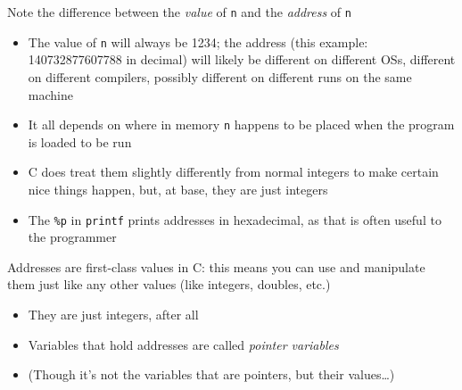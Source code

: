 \documentclass{beamer}
\def\code#1{{\ifmmode\else\large\fi\tt#1}}
\begin{document}
\begin{frame}
Note the difference between the {\em value\/} of \code{n} and the {\em
  address\/} of \code{n}
\begin{itemize}
\item{The value of \code{n} will always be 1234; the address
  (this example: 140732877607788 in decimal) will likely
  be different on different OSs, different on different compilers, possibly
  different on different runs on the same machine}

\item{It all depends on where in memory \code{n} happens to be placed
when the program is loaded to be run}
\end{itemize}
\end{frame}

\begin{frame}
%
\begin{itemize}
\item{C does treat them slightly differently from normal integers to make
  certain nice things happen, but, at base, they are just integers}

\item{The \code{\%p} in \code{printf} prints addresses in hexadecimal,
  as that is often useful to the programmer}

\end{itemize}
\end{frame}

\begin{frame}
Addresses are first-class values in C: this means you can use and manipulate
them just like any other values (like integers, doubles, etc.)
\begin{itemize}
\item{They are just integers, after all}

\item{Variables that hold addresses are called {\em pointer variables}}

\item{(Though it's not the variables that are pointers, but their
  values\dots)}
\end{itemize}
\end{frame}
\end{document}
